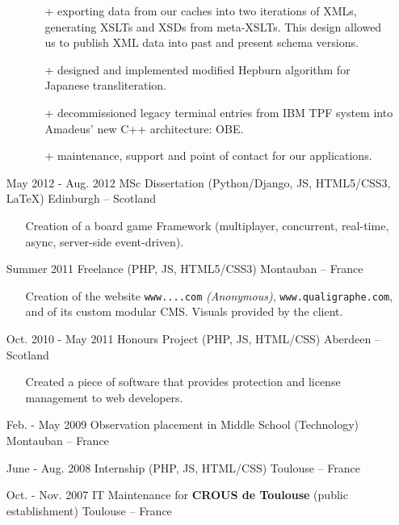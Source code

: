 \documentclass{res}
\begin{document}
\begin{resume}
\begin{itemize}
\begin{itemize}
\begin{itemize}
                                \item[+] exporting data from our caches into two iterations of XMLs, generating XSLTs and XSDs from meta-XSLTs. This design allowed us to publish XML data into past and present schema versions.
																\item[+] designed and implemented modified Hepburn algorithm for Japanese transliteration.
																\item[+] decommissioned legacy terminal entries from IBM TPF system into Amadeus' new C++ architecture: OBE.
                                \item[+] maintenance, support and point of contact for our applications.
                        \end{itemize}
                \end{itemize}
                \item[] May 2012 - Aug. 2012 \tabto{5cm} MSc Dissertation (Python/Django, JS, HTML5/CSS3, \LaTeX{}) \hfill Edinburgh -- Scotland
                \begin{itemize}
                        \item[] Creation of a board game Framework (multiplayer, concurrent, real-time, async, server-side event-driven).
                \end{itemize}
                \item[] Summer 2011 \tabto{5cm} Freelance (PHP, JS, HTML5/CSS3) \hfill Montauban -- France
                \begin{itemize}
                        \item[] Creation of the website \ifisanon \texttt{www....com} \textit{(Anonymous)}, \else \texttt{www.qualigraphe.com}, \fi and of its custom modular CMS. Visuals provided by the client.
                \end{itemize}
                \item[] Oct. 2010 - May 2011 \tabto{5cm} Honours Project (PHP, JS, HTML/CSS) \hfill Aberdeen -- Scotland
                \begin{itemize}
                        \item[] Created a piece of software that provides protection and license management to web developers.
                \end{itemize}
                \item[] Feb. - May 2009 \tabto{5cm} Observation placement in Middle School (Technology) \hfill Montauban -- France
                \item[] June - Aug. 2008 \tabto{5cm} Internship (PHP, JS, HTML/CSS) \hfill Toulouse -- France
                \item[] Oct. - Nov. 2007 \tabto{5cm} IT Maintenance for \textbf{CROUS de Toulouse} (public establishment) \hfill Toulouse -- France
        \end{itemize}
        

\end{resume}
\end{document}

